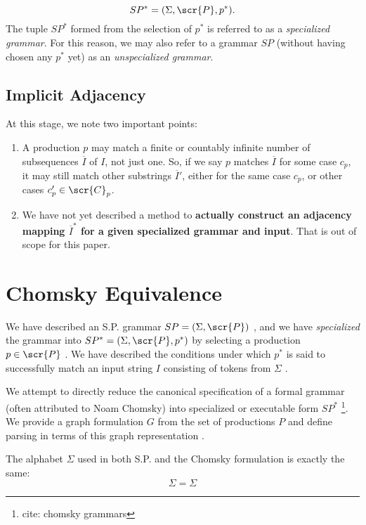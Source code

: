 \documentclass[10pt]{article}
\newcommand{\todocite}[1]{\footnote{cite: #1}}
\begin{document}
\begin{equation}
  \label{eq:specialized}
  SP^* = (\Sigma, \scr{P}, p^*).
\end{equation}
The tuple $SP^*$ formed from the selection of $p^*$ is referred to as a \textit{specialized grammar}. For this reason, we may also refer to a grammar $SP$ (without having chosen any $p^*$ yet) as an \textit{unspecialized grammar}.

\subsection{Implicit Adjacency}
At this stage, we note two important points:
\begin{enumerate}
  \item A production $p$ may match a finite or countably infinite number of subsequences $\overbar{I}$ of $I$, not just one. So, if we say $p$ matches $\overbar{I}$ for some case $c_p$, it may still match other substrings $\overbar{I}'$, either for the same case $c_p$, or other cases $c'_p \in \scr{C}_p$.
  \item We have not yet described a method to \textbf{actually construct an adjacency mapping $\overbar{I}^*$ for a given specialized grammar and input}. That is out of scope for this paper.
\end{enumerate}

\section{Chomsky Equivalence}
\label{sec:chomsky-equivalence}
We have described an S.P. grammar $SP = (\Sigma, \scr{P})$ , and we have \textit{specialized} the grammar into $SP^* = (\Sigma, \scr{P}, p^*)$ by selecting a production $p \in \scr{P}$ . We have described the conditions under which $p^*$ is said to successfully match an input string $I$ consisting of tokens from $\Sigma$ .

We attempt to directly reduce the canonical specification of a formal grammar (often attributed to Noam Chomsky) into specialized or executable form $SP^*$ \todocite{chomsky grammars}. We provide a graph formulation $G$ from the set of productions $P$ and define parsing in terms of this graph representation .

The alphabet $\Sigma$ used in both S.P. and the Chomsky formulation is exactly the same:
\begin{equation}\label{eq:alphabet}
  \Sigma = \Sigma
\end{equation}
\end{document}
